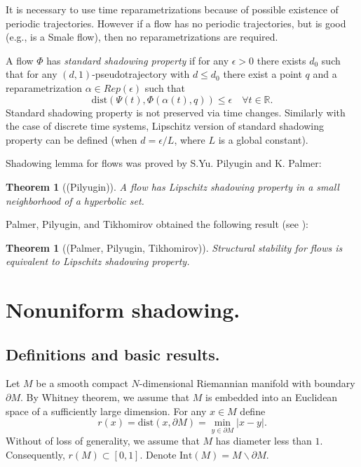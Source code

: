 \documentclass[11pt]{article}
\newcounter{razdel}[section]
\theoremstyle{Mystyle}
\newtheorem{Theorem}[razdel]{Theorem}
\begin{document}
It is necessary to use time reparametrizations because of possible existence of periodic trajectories. However if a flow has no periodic trajectories, but is good (e.g., is a Smale flow), then no reparametrizations are required.

A flow $\Phi$ has \textit{standard shadowing property} if for any $\epsilon>0$ there exists $d_0$ such that for any $(d,1)$-pseudotrajectory with $d\leq d_0$ there exist a point $q$ and a reparametrization $\alpha\in Rep(\epsilon)$ such that
$$\mbox{dist}(\Psi(t),\Phi(\alpha(t), q))\leq\epsilon\quad\forall t\in\mathbb{R}.$$
Standard shadowing property is not preserved via time changes. Similarly with the case of discrete time systems, Lipschitz version of standard shadowing property can be defined (when $d=\epsilon/L$, where $L$ is a global constant).

Shadowing lemma for flows was proved by S.Yu. Pilyugin and K. Palmer:
\begin{Theorem}[(Pilyugin)]
\label{Thfl}
A flow has Lipschitz shadowing property in a small neighborhood of a hyperbolic set.
\end{Theorem}

Palmer, Pilyugin, and Tikhomirov obtained the following result (see \cite{PPT}):
\begin{Theorem}[(Palmer, Pilyugin, Tikhomirov)]
Structural stability for flows is equivalent to Lipschitz shadowing property.
\end{Theorem}

\section{Nonuniform shadowing.}

\subsection{Definitions and basic results.}

Let $M$ be a smooth compact $N$-dimensional Riemannian manifold with boundary $\partial M$. 
By Whitney theorem, we assume that $M$ is embedded into an Euclidean space of a sufficiently large dimension.
For any $x\in M$ define 
$$r(x) = \mbox{dist}(x,\partial M) = \min_{y\in\partial M}|x-y|.$$ 
Without of loss of generality, we assume that $M$ has diameter less than $1$. 
Consequently, $r(M)\subset [0,1]$.
Denote $\mbox{Int}(M) = M\backslash\partial M$.
\end{document}
